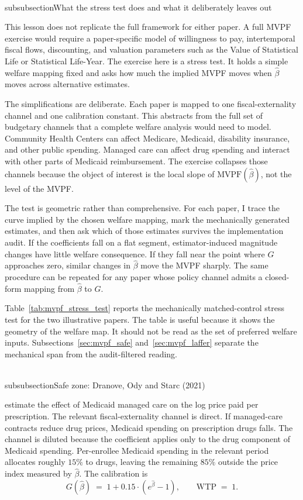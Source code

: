 \documentclass[11pt]{article}
\begin{document}
\\subsubsection{What the stress test does and what it deliberately leaves out}

This lesson does not replicate the full \textcite{hendren2020unified} framework for either paper. A full MVPF exercise would require a paper-specific model of willingness to pay, intertemporal fiscal flows, discounting, and valuation parameters such as the Value of Statistical Life or Statistical Life-Year. The exercise here is a stress test. It holds a simple welfare mapping fixed and asks how much the implied MVPF moves when \(\hat\beta\) moves across alternative estimates.

The simplifications are deliberate. Each paper is mapped to one fiscal-externality channel and one calibration constant. This abstracts from the full set of budgetary channels that a complete welfare analysis would need to model. Community Health Centers can affect Medicare, Medicaid, disability insurance, and other public spending. Managed care can affect drug spending and interact with other parts of Medicaid reimbursement. The exercise collapses those channels because the object of interest is the local slope of \(\mathrm{MVPF}(\hat\beta)\), not the level of the MVPF.

The test is geometric rather than comprehensive. For each paper, I trace the curve implied by the chosen welfare mapping, mark the mechanically generated estimates, and then ask which of those estimates survives the implementation audit. If the coefficients fall on a flat segment, estimator-induced magnitude changes have little welfare consequence. If they fall near the point where \(G\) approaches zero, similar changes in \(\hat\beta\) move the MVPF sharply. The same procedure can be repeated for any paper whose policy channel admits a closed-form mapping from \(\hat\beta\) to \(G\).

Table~\ref{tab:mvpf_stress_test} reports the mechanically matched-control stress test for the two illustrative papers. The table is useful because it shows the geometry of the welfare map. It should not be read as the set of preferred welfare inputs. Subsections~\ref{sec:mvpf_safe} and~\ref{sec:mvpf_laffer} separate the mechanical span from the audit-filtered reading.




\\subsubsection{Safe zone: Dranove, Ody and Starc (2021)}
\label{sec:mvpf_safe}

\textcite{dranove2021dose} estimate the effect of Medicaid managed care on the log price paid per prescription. The relevant fiscal-externality channel is direct. If managed-care contracts reduce drug prices, Medicaid spending on prescription drugs falls. The channel is diluted because the coefficient applies only to the drug component of Medicaid spending. Per-enrollee Medicaid spending in the relevant period allocates roughly \(15\%\) to drugs, leaving the remaining \(85\%\) outside the price index measured by \(\hat\beta\). The calibration is
\begin{equation*}
G(\hat\beta) \;=\; 1 + 0.15\cdot(e^{\hat\beta}-1), \qquad \mathrm{WTP} \;=\; 1.
\end{equation*}
\end{document}
